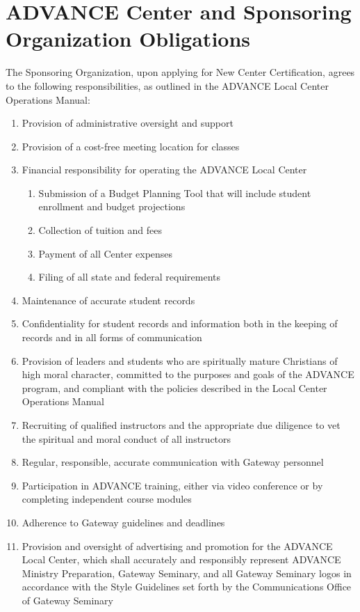 \documentclass{article}
\begin{document}
\section*{\textbf{ADVANCE Center and Sponsoring Organization Obligations}}
The Sponsoring Organization, upon applying for New Center Certification, agrees to the following responsibilities, as outlined in the ADVANCE Local Center Operations Manual:
\begin{enumerate} \singlespacing
    \item Provision of administrative oversight and support
    \item Provision of a cost-free meeting location for classes
    \item Financial responsibility for operating the ADVANCE Local Center
    \begin{enumerate}[label=\alph*.] %
        \item Submission of a Budget Planning Tool that will include student enrollment and budget projections
        \item Collection of tuition and fees
        \item Payment of all Center expenses
        \item Filing of all state and federal requirements
    \end{enumerate}
    \item Maintenance of accurate student records
    \item Confidentiality for student records and information both in the keeping of records and in all forms of communication
    \item Provision of leaders and students who are spiritually mature Christians of high moral character, committed to the purposes and goals of the ADVANCE program, and compliant with the policies described in the Local Center Operations Manual
    \item Recruiting of qualified instructors and the appropriate due diligence to vet the spiritual and moral conduct of all instructors
    \item Regular, responsible, accurate communication with Gateway personnel
    \item Participation in ADVANCE training, either via video conference or by completing independent course modules
    \item Adherence to Gateway guidelines and deadlines
    \item Provision and oversight of advertising and promotion for the ADVANCE Local Center, which shall accurately and responsibly represent ADVANCE Ministry Preparation, Gateway Seminary, and all Gateway Seminary logos in accordance with the Style Guidelines set forth by the Communications Office of Gateway Seminary

\end{enumerate}
\end{document}

